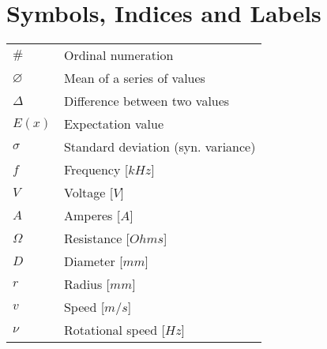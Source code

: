 {\begin{longtable}[h]{@{}p{} @{}p{}@{}}
\end{longtable}
}

\section*{Symbols, Indices and Labels}
{\renewcommand{\arraystretch}{1.1} \renewcommand{\tabcolsep}{0.2cm}
\begin{longtable}[h]{@{}p{} @{}p{}@{}}
$\#$            &Ordinal numeration\\
$\varnothing$   &Mean of a series of values\\
$\Delta$        &Difference between two values\\
$E(x)$          &Expectation value\\
$\sigma$        &Standard deviation (syn. variance)\vspace{13pt}\\
$f$             &Frequency [$kHz$]\\
$V$             &Voltage [$V$]\\    
$A$             &Amperes [$A$]\\
$\Omega$        &Resistance [$Ohms$]\\
$D$             &Diameter [$mm$]\\
$r$             &Radius [$mm$]\\
$v$             &Speed [$m/s$]\\
$\nu$           &Rotational speed [$Hz$]
\end{longtable}
}